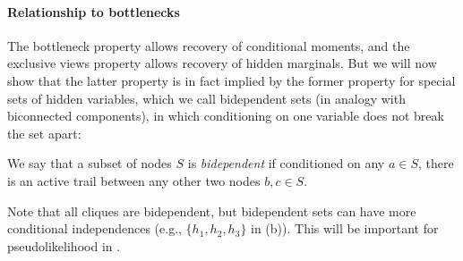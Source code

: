 \paragraph{Relationship to bottlenecks}


The bottleneck property allows recovery of conditional moments,
and the exclusive views property allows recovery of hidden marginals.
But we will now show that the latter property is in fact implied by the former
property for special sets of hidden variables, which we call bidependent
sets (in analogy with biconnected components),
in which conditioning on one variable does not break the set apart:
\begin{definition}
We say that a subset of nodes $S$ is \emph{bidependent} if
conditioned on any $a \in S$, there is an active trail between any other two nodes $b,c \in S$.
\end{definition}
Note that all cliques are bidependent, but bidependent sets can have more conditional independences
(e.g., $\{h_1,h_2,h_3\}$ in (b)).
This will be important for pseudolikelihood in .

